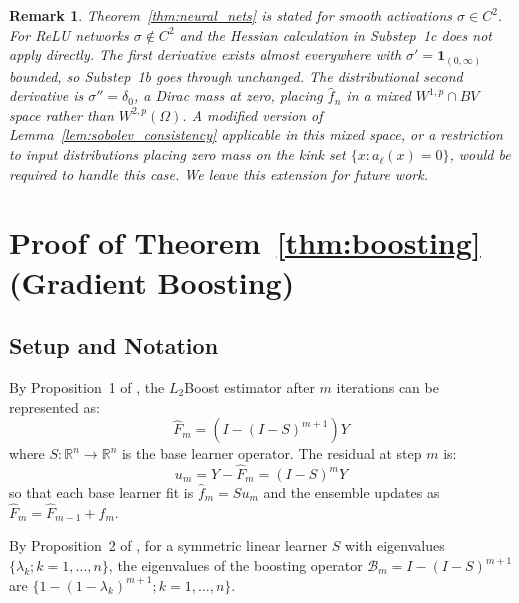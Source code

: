 \documentclass[12pt]{article}
\newtheorem{remark}{Remark}
\newcommand{\Wtwop}{W^{2,p}(\Omega)}
\newcommand{\fn}{\hat{f}_n}
\begin{document}
	\begin{remark}
		Theorem~\ref{thm:neural_nets} is stated for smooth activations $\sigma \in
		C^2$. For ReLU networks $\sigma \notin C^2$ and the Hessian calculation in
		Substep~1c does not apply directly. The first derivative exists almost
		everywhere with $\sigma' = \mathbf{1}_{(0,\infty)}$ bounded, so Substep~1b
		goes through unchanged. The distributional second derivative is $\sigma'' =
		\delta_0$, a Dirac mass at zero, placing $\fn$ in a mixed $W^{1,p} \cap BV$
		space rather than $\Wtwop$. A modified version of
		Lemma~\ref{lem:sobolev_consistency} applicable in this mixed space, or a
		restriction to input distributions placing zero mass on the kink set
		$\{x : a_\ell(x) = 0\}$, would be required to handle this case. We leave
		this extension for future work.
	\end{remark}
	
	\section{Proof of Theorem~\ref{thm:boosting} (Gradient Boosting)}
	\label{app:boosting}
	
	\subsection{Setup and Notation}
	
	By Proposition~1 of \citet{buhlmann2003boosting}, the $L_2$Boost estimator after
	$m$ iterations can be represented as:
	\begin{equation}
		\hat{F}_m = (I - (I-S)^{m+1})Y
	\end{equation}
	where $S: \mathbb{R}^n \to \mathbb{R}^n$ is the base learner operator. The residual
	at step $m$ is:
	\begin{equation}
		u_m = Y - \hat{F}_m = (I-S)^m Y
	\end{equation}
	so that each base learner fit is $\hat{f}_m = Su_m$ and the ensemble updates as
	$\hat{F}_m = \hat{F}_{m-1} + \hat{f}_m$.
	
	By Proposition~2 of \citet{buhlmann2003boosting}, for a symmetric linear learner $S$
	with eigenvalues $\{\lambda_k; k = 1,\ldots,n\}$, the eigenvalues of the boosting
	operator $\mathcal{B}_m = I - (I-S)^{m+1}$ are $\{1-(1-\lambda_k)^{m+1}; k =
	1,\ldots,n\}$.
	
\end{document}
